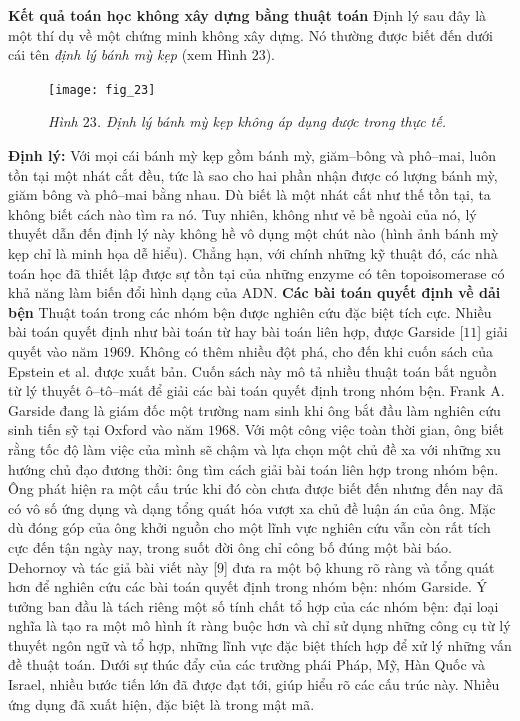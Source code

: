\begin{multicols}{2}
	\vskip 0.1cm
	\textbf{\color{duongvaotoanhoc}Kết quả toán học không xây dựng bằng thuật toán}
	\vskip 0.1cm
	Định lý sau đây là một thí dụ về một chứng minh không xây dựng. Nó thường được biết đến dưới cái tên \textit{định lý bánh mỳ kẹp} (xem Hình $23$).
	\begin{figure}[H]
		\vspace*{-5pt}
		\centering
		\captionsetup{labelformat= empty, justification=centering}
		\texttt{[image: fig\_23]}
		\caption{\small\textit{\color{duongvaotoanhoc}Hình $23$. Định lý bánh mỳ kẹp không áp dụng được trong thực tế.}}
		\vspace*{-5pt}
	\end{figure}
	\textbf{\color{duongvaotoanhoc}Định lý:} Với mọi cái bánh mỳ kẹp gồm bánh mỳ, giăm--bông và phô--mai, luôn tồn tại một nhát cắt đều, tức là sao cho hai phần nhận được có lượng bánh mỳ, giăm bông và phô--mai bằng nhau.
	\vskip 0.1cm
	Dù biết là một nhát cắt như thế tồn tại, ta không biết cách nào tìm ra nó. Tuy nhiên, không như vẻ bề ngoài của nó, lý thuyết dẫn đến định lý này không hề vô dụng một chút nào (hình ảnh bánh mỳ kẹp chỉ là minh họa dễ hiểu). Chẳng hạn, với chính những kỹ thuật đó, các nhà toán học đã thiết lập được sự tồn tại của những enzyme có tên topoisomerase có khả năng làm biến đổi hình dạng của ADN.
	\vskip 0.1cm
	\textbf{\color{duongvaotoanhoc}Các bài toán quyết định về dải bện}
	\vskip 0.1cm
	Thuật toán trong các nhóm bện được nghiên cứu đặc biệt tích cực. Nhiều bài toán quyết định như bài toán từ hay bài toán liên hợp, được Garside [$11$] giải quyết vào năm $1969$. Không có thêm nhiều đột phá, cho đến khi cuốn sách của Epstein et al. được xuất bản. Cuốn sách này mô tả nhiều thuật toán bắt nguồn từ lý thuyết ô--tô--mát để giải các bài toán quyết định trong nhóm bện.
	\vskip 0.1cm
	Frank A. Garside đang là giám đốc một trường nam sinh khi ông bắt đầu làm nghiên cứu sinh tiến sỹ tại Oxford vào năm $1968$. Với một công việc toàn thời gian, ông biết rằng tốc độ làm việc của mình sẽ chậm và lựa chọn một chủ đề xa với những xu hướng chủ đạo đương thời: ông tìm cách giải bài toán liên hợp trong nhóm bện. Ông phát hiện ra một cấu trúc khi đó còn chưa được biết đến nhưng đến nay đã có vô số ứng dụng và dạng tổng quát hóa vượt xa chủ đề luận án của ông. Mặc dù đóng góp của ông khởi nguồn cho một lĩnh vực nghiên cứu vẫn còn rất tích cực đến tận ngày nay, trong suốt đời ông chỉ công bố đúng một bài báo.
	\vskip 0.1cm
	Dehornoy và tác giả bài viết này [$9$] đưa ra một bộ khung rõ ràng và tổng quát hơn để nghiên cứu các bài toán quyết định trong nhóm bện: nhóm Garside. Ý tưởng ban đầu là tách riêng một số tính chất tổ hợp của các nhóm bện: đại loại nghĩa là tạo ra một mô hình ít ràng buộc hơn và chỉ sử dụng những công cụ từ lý thuyết ngôn ngữ và tổ hợp, những lĩnh vực đặc biệt thích hợp để xử lý những vấn đề thuật toán. Dưới sự thúc đẩy của các trường phái Pháp, Mỹ, Hàn Quốc và Israel, nhiều bước tiến lớn đã được đạt tới, giúp hiểu rõ các cấu trúc này. Nhiều ứng dụng đã xuất hiện, đặc biệt là trong mật mã.

\end{multicols}
